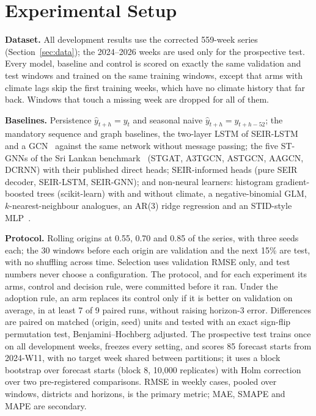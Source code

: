 \section{Experimental Setup}
\label{sec:setup}

\textbf{Dataset.} All development results use the corrected 559-week series
(Section~\ref{sec:data}); the 2024--2026 weeks are used only for the prospective test.
Every model, baseline and control is scored on exactly the same validation and test
windows and trained on the same training windows, except that arms with climate lags
skip the first training weeks, which have no climate history that far back. Windows
that touch a missing week are dropped for all of them.

\textbf{Baselines.} Persistence $\hat y_{t+h}=y_t$ and seasonal naive
$\hat y_{t+h}=y_{t+h-52}$; the mandatory sequence and graph baselines, the two-layer
LSTM of SEIR-LSTM~\cite{liu2025seirlstm} and a GCN~\cite{kipf2017gcn} against the same
network without message passing; the five ST-GNNs of the Sri Lankan
benchmark~\cite{weng2024graph} (STGAT, A3TGCN, ASTGCN, AAGCN, DCRNN) with their
published direct heads; SEIR-informed heads (pure SEIR decoder, SEIR-LSTM, SEIR-GNN);
and non-neural learners: histogram gradient-boosted trees (scikit-learn) with
and without climate, a negative-binomial GLM, $k$-nearest-neighbour analogues, an AR(3)
ridge regression and an STID-style MLP~\cite{shao2022stid}.

\textbf{Protocol.} Rolling origins at 0.55, 0.70 and 0.85 of the series, with three
seeds each; the 30 windows before each origin are validation and the next 15\% are
test, with no shuffling across time. Selection uses validation RMSE only, and test
numbers never choose a configuration. The protocol, and for each experiment its arms,
control and decision rule, were committed before it ran. Under the adoption rule, an arm
replaces its control only if it is better on validation on average, in at least 7 of
9 paired runs, without raising horizon-3 error. Differences are paired on
matched (origin, seed) units and tested with an exact sign-flip permutation test,
Benjamini--Hochberg adjusted. The prospective test trains once on all development
weeks, freezes every setting, and scores 85 forecast starts from 2024-W11, with no
target week shared between partitions; it uses a block bootstrap over forecast starts
(block 8, 10{,}000 replicates) with Holm correction over two pre-registered comparisons.
RMSE in weekly cases, pooled over windows, districts and horizons, is the primary
metric; MAE, SMAPE and MAPE are secondary.
